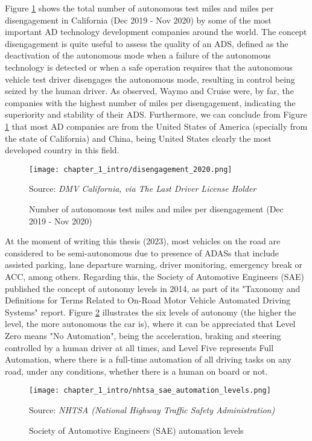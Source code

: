 Figure \ref{fig:chapter_1_intro/disengagement_2020} shows the total number of autonomous test miles and miles per disengagement in California (Dec 2019 - Nov 2020) by some of the most important \ac{AD} technology development companies around the world. The concept disengagement is quite useful to assess the quality of an \ac{ADS}, defined as the deactivation of the autonomous mode when a failure of the autonomous technology is detected or when a safe operation requires that the autonomous vehicle test driver disengages the autonomous mode, resulting in control being seized by the human driver. As observed, Waymo and Cruise were, by far, the companies with the highest number of miles per disengagement, indicating the superiority and stability of their \ac{ADS}. Furthermore, we can conclude from Figure \ref{fig:chapter_1_intro/disengagement_2020} that most \ac{AD} companies are from the United States of America (specially from the state of California) and China, being United States clearly the most developed country in this field.  

\begin{figure}[ht]
	\centering
	\texttt{[image: chapter\_1\_intro/disengagement\_2020.png]}
	\caption{Number of autonomous test miles and miles per disengagement (Dec 2019 - Nov 2020)}
	Source: \textit{DMV California, via The Last Driver License Holder}
	\label{fig:chapter_1_intro/disengagement_2020}
\end{figure}

At the moment of writing this thesis (2023), most vehicles on the road are considered to be semi-autonomous due to presence of \acp{ADAS} that include assisted parking, lane departure warning, driver monitoring, emergency break or \ac{ACC}, among others. Regarding this, the Society of Automotive Engineers (SAE) published the concept of autonomy levels in 2014, as part of its "Taxonomy and Definitions for Terms Related to On-Road Motor Vehicle Automated Driving Systems" \cite{taxonomy2016definitions} report. Figure \ref{fig:chapter_1_intro/nhtsa_sae_automation_levels} illustrates the six levels of autonomy (the higher the level, the more autonomous the car is), where it can be appreciated that Level Zero means "No Automation", being the acceleration, braking and steering controlled by a human driver at all times, and Level Five represents Full Automation, where there is a full-time automation of all driving tasks on any road, under any conditions, whether there is a human on board or not.

\begin{figure}[h]
	\centering
	\texttt{[image: chapter\_1\_intro/nhtsa\_sae\_automation\_levels.png]}
	\caption{Society of Automotive Engineers (SAE) automation levels}
    Source: \textit{NHTSA (National Highway Traffic Safety Administration)}
	\label{fig:chapter_1_intro/nhtsa_sae_automation_levels}
\end{figure}

